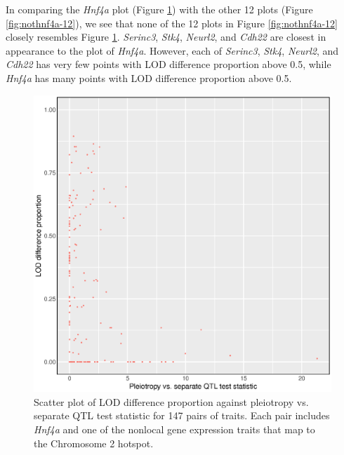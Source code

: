 \documentclass{article}
\begin{document}
In comparing the \emph{Hnf4a} plot (Figure \ref{fig:hnf4a}) with the other 12 plots (Figure \ref{fig:nothnf4a-12}), we see that none of the 12 plots in Figure \ref{fig:nothnf4a-12} closely resembles Figure \ref{fig:hnf4a}. \emph{Serinc3}, \emph{Stk4}, \emph{Neurl2}, and \emph{Cdh22} are closest in appearance to the plot of \emph{Hnf4a}. However, each of \emph{Serinc3}, \emph{Stk4}, \emph{Neurl2}, and \emph{Cdh22} has very few points with LOD difference proportion above 0.5, while \emph{Hnf4a} has many points with LOD difference proportion above 0.5.

\begin{figure}
    \centering
    \includegraphics[width = \textwidth]{../Rmd/Hnf4a-lod-diff-prop-v-lrt.eps}
    \caption{Scatter plot of LOD difference proportion against pleiotropy vs. separate QTL test statistic for 147 pairs of traits. Each pair includes \emph{Hnf4a} and one of the nonlocal gene expression traits that map to the Chromosome 2 hotspot.}
    \label{fig:hnf4a}
\end{figure}
\end{document}
